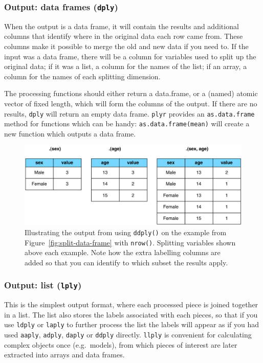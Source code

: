 \documentclass{scrartcl}
\newcommand{\code}[1]{\lstinline!#1!}
\newcommand{\f}[1]{\lstinline!#1()!}
\newcommand{\plyr}{{\tt plyr}\xspace}
\begin{document}
\subsubsection{Output: data frames ({\tt *dply})}

When the output is a data frame, it will contain the results and additional columns that identify where in the original data each row came from.  These columns make it possible to merge the old and new data if you need to.  If the input was a data frame, there will be a column for variables used to split up the original data; if it was a list, a column for the names of the list; if an array, a column for the names of each splitting dimension.

The processing functions should either return a data.frame, or a (named) atomic vector of fixed length, which will form the columns of the output. If there are no results, {\tt *dply} will return an empty data frame.  \plyr provides an \code{as.data.frame} method for functions which can be handy: \code{as.data.frame(mean)} will create a new function which outputs a data frame.

\begin{figure}[htbp]
  \centering
    \includegraphics[width = 0.8 \textwidth]{output-d}
  \caption{Illustrating the output from using \f{ddply} on the example from Figure~\ref{fig:split-data-frame} with \f{nrow}.  Splitting variables shown above each example.  Note how the extra labelling columns are added so that you can identify to which subset the results apply.}
  \label{fig:label}
\end{figure}

\subsubsection{Output: list ({\tt *lply})}

This is the simplest output format, where each processed piece is joined together in a list.  The list also stores the labels associated with each pieces, so that if you use {\tt ldply} or {\tt laply} to further process the list the labels will appear as if you had used {\tt aaply}, {\tt adply}, {\tt daply} or {\tt ddply} directly.  {\tt llply} is convenient for calculating complex objects once (e.g.\ models), from which pieces of interest are later extracted into arrays and data frames.
\end{document}
